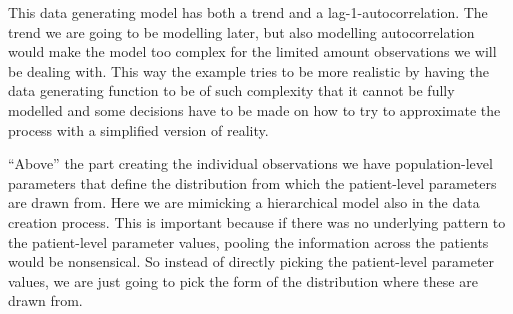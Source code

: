 \documentclass[12pt,a4paper,leqno]{report}
\theoremstyle{plain}
\theoremstyle{definition}
\theoremstyle{remark}
\begin{document}
This data generating model has both a trend and a lag-1-autocorrelation. The trend we
are going to be modelling later, but also modelling autocorrelation would make the model
too complex for the limited amount observations we will be dealing with. This way the example tries to be more realistic
by having the data generating function to be of such complexity that it cannot be
fully modelled and some decisions have to be made on how to try to approximate
the process with a simplified version of reality.

``Above'' the part creating the individual observations we have population-level parameters
that define the distribution from which the patient-level parameters are drawn from.
Here we are mimicking a hierarchical model also in the data creation process. This is
important because if there was no underlying pattern to the patient-level parameter
values, pooling the information across the patients
would be nonsensical. So instead of directly picking the patient-level parameter values,
we are just going to pick the form of the distribution where these are drawn from.

\bigskip
{}
\bigskip
\end{document}
